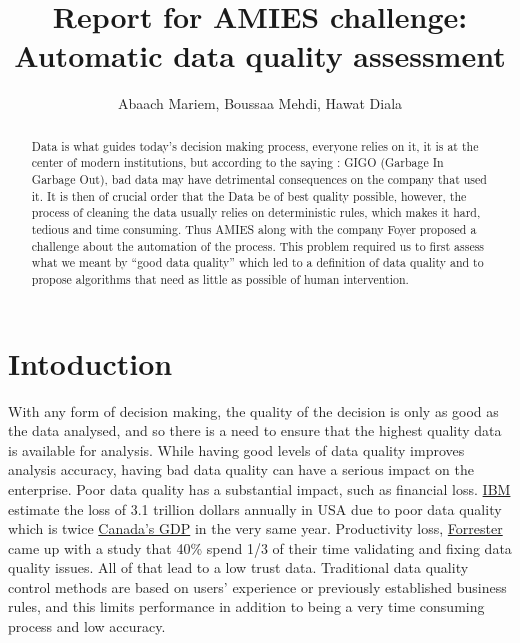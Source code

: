 \documentclass{article}
\title{\Large Report for AMIES challenge: Automatic data quality assessment}
\author{Abaach Mariem, Boussaa Mehdi, Hawat Diala}
\date{}
\begin{document}
\maketitle

\begin{abstract}
    Data is what guides today's decision making process, everyone relies on it, it is at the center of modern institutions, but according to the saying : GIGO (Garbage In Garbage Out), bad data may have detrimental consequences on the company that used it.  It is then of crucial order that the Data be of best quality possible, however, the process of cleaning the data usually relies on deterministic rules, which makes it hard, tedious and time consuming. Thus AMIES along with the company Foyer proposed a challenge about the automation of the process. This problem required us to first assess what we meant by ``good data quality'' which led to a definition of data quality and to propose algorithms that need as little as possible of human intervention.
\end{abstract}

\section{Intoduction} %
\label{sec:Intoduction}
With any form of decision making, the quality of the decision is only as good as the data analysed, and so there is a need to ensure that the highest quality data is available for analysis. While having good levels of data quality improves analysis accuracy, having bad data quality can have a serious impact on the enterprise.
Poor data quality has a substantial impact, such as financial loss.  \href{https://www.ibm.com/blogs/journey-to-ai/}{IBM} estimate the loss of 3.1 trillion dollars annually  in USA due to poor data quality which is twice \href{https://data.worldbank.org/indicator/NY.GDP.MKTP.CD}{Canada’s GDP} in the very same year. Productivity loss, \href{https://www.forrester.com/report/Build-Trusted-Data-With-Data-Quality/RES83344}{Forrester} came up with a study that 40\% spend 1/3 of their time validating and fixing data quality issues. All of that lead to a low trust data.
Traditional data quality control methods are based on users’ experience or previously established business rules, and this
limits performance in addition to being a very time consuming process and low accuracy.
\end{document}
